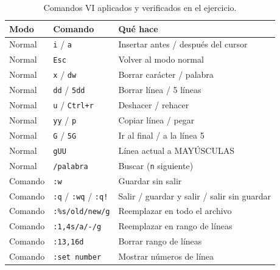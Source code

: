 \begin{table}[H]
  \centering
  \begin{tabular}{lll}
    \toprule
    Modo & Comando & Qué hace \\
    \midrule
    Normal & \texttt{i} / \texttt{a} & Insertar antes / después del cursor \\
    Normal & \texttt{Esc} & Volver al modo normal \\
    Normal & \texttt{x} / \texttt{dw} & Borrar carácter / palabra \\
    Normal & \texttt{dd} / \texttt{5dd} & Borrar línea / 5 líneas \\
    Normal & \texttt{u} / \texttt{Ctrl+r} & Deshacer / rehacer \\
    Normal & \texttt{yy} / \texttt{p} & Copiar línea / pegar \\
    Normal & \texttt{G} / \texttt{5G} & Ir al final / a la línea 5 \\
    Normal & \texttt{gUU} & Línea actual a MAYÚSCULAS \\
    Normal & \texttt{/palabra} & Buscar (\texttt{n} siguiente) \\
    Comando & \texttt{:w} & Guardar sin salir \\
    Comando & \texttt{:q} / \texttt{:wq} / \texttt{:q!} & Salir / guardar y salir / salir sin guardar \\
    Comando & \texttt{:\%s/old/new/g} & Reemplazar en todo el archivo \\
    Comando & \texttt{:1,4s/a/-/g} & Reemplazar en rango de líneas \\
    Comando & \texttt{:13,16d} & Borrar rango de líneas \\
    Comando & \texttt{:set number} & Mostrar números de línea \\
    \bottomrule
  \end{tabular}
  \caption{Comandos VI aplicados y verificados en el ejercicio.}
\end{table}

